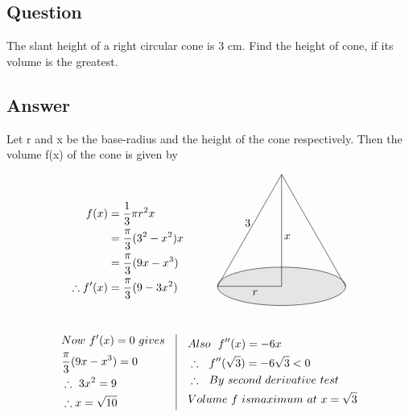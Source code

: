 \documentclass[17pt]{extarticle}
\begin{document}
\begin{fleqn}

\section{Question}
The slant height of a right circular cone is 3 cm. Find the height of cone, if its volume is the greatest.


\subsection*{Answer}
Let  r  and x  be the base-radius and the height of the cone respectively. Then the volume f(x) of the cone is given by

\begin{equation} \nonumber
\begin{alignedat}{4}
f(x) &= \frac{1}{3}\pi r^2x\\
&= \frac{\pi}{3}(3^2-x^2)x\\
&= \frac{\pi}{3}(9x - x^3)\\
\therefore f'(x) &=  \frac{\pi}{3}(9 - 3x^2)\\
\end{alignedat}
\quad\quad\quad
\begin{alignedat}{4}
\begin{tikzpicture}
\filldraw[fill=gray!20](0,0) ellipse (2cm and 0.6cm);
\draw (0,0) -- node[below] {\ \ \ $x$}(0,3.5);
\draw (0,0)  -- node[below] {\ \ \ $r$} (-2,0);
\draw  (-2,0) --node[above] {3\ \ }(0,3.5);
\draw  (2,0) -- (0,3.5);
\end{tikzpicture}\\\\
\end{alignedat}
\end{equation}
\begin{equation} \nonumber
\begin{alignedat}{4}
& Now\ f'(x) = 0\ gives\\
& \frac{\pi}{3}(9x - x^3)=0\\
& \therefore \ 3x^2=9\\
& \therefore x = \sqrt{10}
\end{alignedat}
\quad
\vrule
\quad
\begin{alignedat}{4}
& Also\ \ f''(x) =-6x\\
& \therefore\ \ f''(\sqrt{3})=-6\sqrt{3}<0\\
& \therefore \ \ By\ second\ derivative\ test\\
& Volume \ f\ is maximum\ at\ x=\sqrt{3}
\end{alignedat}
\end{equation}


\end{fleqn}
\end{document}
